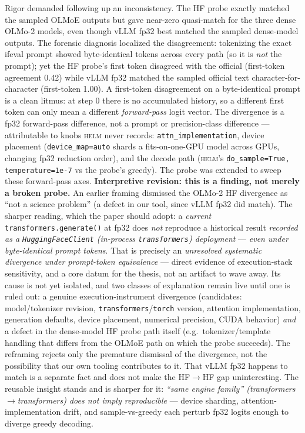 \documentclass[11pt]{report}
\newcommand{\code}[1]{\texttt{#1}}
\begin{document}
Rigor demanded following up an inconsistency. The HF probe exactly matched the sampled OLMoE outputs but gave near-zero quasi-match for the three dense OLMo-2 models,
even though vLLM fp32 best matched the sampled dense-model outputs. The forensic diagnosis localized the disagreement:
tokenizing the exact ifeval prompt showed byte-identical tokens across every path
(so it is \emph{not} the prompt); yet the HF probe's first token disagreed with the
official (first-token agreement 0.42) while vLLM fp32 matched the sampled official text character-for-
character (first-token 1.00). A first-token disagreement on a byte-identical prompt
is a clean litmus: at step 0 there is no accumulated history, so a different first
token can only mean a different \emph{forward-pass} logit vector. The divergence is
a fp32 forward-pass difference, not a prompt or precision-class difference ---
attributable to knobs \textsc{helm} never records: \code{attn\_implementation},
device placement (\code{device\_map=auto} shards a fits-on-one-GPU model across
GPUs, changing fp32 reduction order), and the decode path (\textsc{helm}'s
\code{do\_sample=True, temperature=1e-7} vs the probe's greedy). The probe was
extended to sweep these forward-pass axes. \textbf{Interpretive revision: this is a
finding, not merely a broken probe.} An earlier framing dismissed the OLMo-2 HF
divergence as ``not a science problem'' (a defect in our tool, since vLLM fp32 did
match). The sharper reading, which the paper should adopt: a \emph{current}
\code{transformers.generate()} at fp32 does \emph{not} reproduce a historical result
\emph{recorded as a \code{HuggingFaceClient} (in-process \code{transformers})
deployment} --- \emph{even under byte-identical prompt tokens}. That is precisely an
\emph{unresolved systematic divergence under prompt-token equivalence} --- direct
evidence of execution-stack sensitivity, and a core datum for the thesis, not an
artifact to wave away. Its cause is not yet isolated, and two classes of explanation
remain live until one is ruled out: a genuine execution-instrument divergence
(candidates: model/tokenizer revision, \code{transformers}/\code{torch} version,
attention implementation, generation defaults, device placement, numerical precision,
CUDA behavior) \emph{and} a defect in the dense-model HF probe path itself (e.g.\
tokenizer/template handling that differs from the OLMoE path on which the probe
succeeds). The reframing rejects only the premature dismissal of the divergence, not
the possibility that our own tooling contributes to it. That vLLM fp32 happens to match is a separate fact and
does not make the HF$\to$HF gap uninteresting. The reusable insight stands and is
sharper for it: \emph{``same engine family'' (transformers$\rightarrow$transformers)
does not imply reproducible} --- device sharding, attention-implementation drift, and
sample-vs-greedy each perturb fp32 logits enough to diverge greedy decoding.
\end{document}
